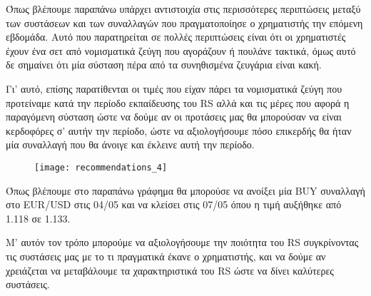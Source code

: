 Όπως βλέπουμε παραπάνω υπάρχει αντιστοιχία στις περισσότερες περιπτώσεις μεταξύ των συστάσεων και των συναλλαγών που πραγματοποίησε ο χρηματιστής την επόμενη εβδομάδα. Αυτό που παρατηρείται σε πολλές περιπτώσεις είναι ότι οι χρηματιστές έχουν ένα σετ από νομισματικά ζεύγη που αγοράζουν ή πουλάνε τακτικά, όμως αυτό δε σημαίνει ότι μία σύσταση πέρα από τα συνηθισμένα ζευγάρια είναι κακή. 

Γι’ αυτό, επίσης παρατίθενται οι τιμές που είχαν πάρει τα νομισματικά ζεύγη που προτείναμε κατά την περίοδο εκπαίδευσης του RS αλλά και τις μέρες που αφορά η παραγόμενη σύσταση ώστε να δούμε αν οι προτάσεις μας θα μπορούσαν να είναι κερδοφόρες σ’ αυτήν την περίοδο, ώστε να αξιολογήσουμε πόσο επικερδής θα ήταν μία συναλλαγή που θα άνοιγε και έκλεινε αυτή την περίοδο. 

\begin{figure}[H]
  \centering
  \texttt{[image: recommendations\_4]}
  \label{fig:recommendations_4}
\end{figure}

Όπως βλέπουμε στο παραπάνω γράφημα θα μπορούσε να ανοίξει μία BUY συναλλαγή στο EUR/USD στις 04/05 και να κλείσει στις 07/05 όπου η τιμή αυξήθηκε από 1.118 σε 1.133.

Μ’ αυτόν τον τρόπο μπορούμε να αξιολογήσουμε την ποιότητα του RS συγκρίνοντας τις συστάσεις μας με το τι πραγματικά έκανε ο χρηματιστής, και να δούμε αν χρειάζεται να μεταβάλουμε τα χαρακτηριστικά του RS ώστε να δίνει καλύτερες συστάσεις.

